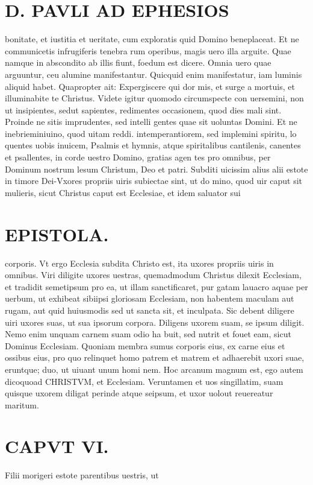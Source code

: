 \documentclass{article}
\begin{document}
\begin{pages}
\section*{D. PAVLI AD EPHESIOS }
\marginpar{[ p.6.  ]}
\marginpar{[ p.7.  ]}
\marginpar{[ p.8.  ]}
\marginpar{[ p.9.  ]}\pstart bonitate, et iustitia et ueritate, cum exploratis quid Domino beneplaceat.  \pend\pstart Et ne communicetis infrugiferis tenebra rum operibus, magis uero illa arguite. Quae namque in abscondito ab illis fiunt, foedum est dicere. Omnia uero quae arguuntur, ceu alumine manifestantur. Quicquid enim manifestatur, iam luminis aliquid habet. Quapropter ait: Expergiscere qui dor mis, et surge a mortuis, et illuminabite te Christus.  \pend\pstart Videte igitur quomodo circumspecte con uersemini, non ut insipientes, sedut sapientes, redimentes occasionem, quod dies mali sint. Proinde ne sitis imprudentes, sed intelli gentes quae sit uoluntas Domini.  \pend\pstart Et ne inebrieminiuino, quod uitam reddi. intemperantiorem, sed implemini spiritu, lo quentes uobis inuicem, Psalmis et hymnis, atque spiritalibus cantilenis, canentes et psallentes, in corde uestro Domino, gratias agen tes pro omnibus, per Dominum nostrum lesum Christum, Deo et patri.  \pend\pstart Subditi uicissim alius alii estote in timore Dei-Vxores propriis uiris subiectae sint, ut do mino, quod uir caput sit mulieris, sicut Christus caput est Ecclesiae, et idem saluator sui  \pend
\section*{EPISTOLA. }
\marginpar{[ p.2 ]}
\marginpar{[ p.10.  ]}
\marginpar{[ p.11.  ]}\pstart corporis. Vt ergo Ecclesia subdita Christo est, ita uxores propriis uiris in omnibus.  \pend\pstart Viri diligite uxores uestras, quemadmodum Christus dilexit Ecclesiam, et tradidit semetipsum pro ea, ut illam sanctificaret, pur gatam lauacro aquae per uerbum, ut exhibeat sibiipsi gloriosam Ecclesiam, non habentem maculam aut rugam, aut quid huiusmodis sed ut sancta sit, et inculpata. Sic debent diligere uiri uxores suas, ut sua ipsorum corpora. Diligens uxorem suam, se ipsum diligit. Nemo enim unquam carnem suam odio ha buit, sed nutrit et fouet eam, sicut Dominus Ecclesiam.  \pend\pstart Quoniam membra sumus corporis eius, ex carne eius et ossibus eius, pro quo relinquet homo patrem et matrem et adhaerebit uxori suae, eruntque; duo, ut uiuant unum homi nem. Hoc arcanum magnum est, ego autem dicoquoad CHRISTVM, et Ecclesiam. Veruntamen et uos singillatim, suam quisque uxorem diligat perinde atque seipsum, et uxor uolout reuereatur maritum.  \pend
\endnumbering\beginnumbering\section{CAPVT VI.}\pstart Filii morigeri estote parentibus uestris, ut  \pend

\end{pages}
\end{document}
